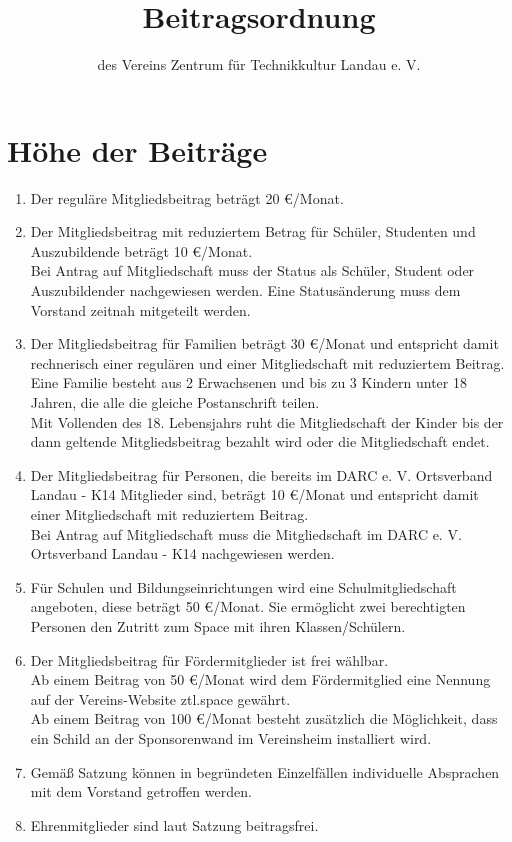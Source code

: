 \documentclass[a4paper, 12pt]{scrartcl}
\begin{document}
\title{Beitragsordnung}
\subtitle{des Vereins Zentrum für Technikkultur Landau e. V.}
\author{}
\date{}

\maketitle

\section{Höhe der Beiträge}\label{beitraege}
\begin{enumerate}
	\item Der reguläre Mitgliedsbeitrag beträgt 20 \euro/Monat.
	\item Der Mitgliedsbeitrag mit reduziertem Betrag für Schüler, Studenten und Auszubildende beträgt 10 \euro/Monat.\\ 
	Bei Antrag auf Mitgliedschaft muss der Status als Schüler, Student oder Auszubildender nachgewiesen werden.
	Eine Statusänderung muss dem Vorstand zeitnah mitgeteilt werden.
	\item Der Mitgliedsbeitrag für Familien beträgt 30 \euro/Monat und entspricht damit rechnerisch einer regulären und einer Mitgliedschaft mit reduziertem Beitrag. \\ 
Eine Familie besteht aus 2 Erwachsenen und bis zu 3 Kindern unter 18 Jahren, die alle die gleiche Postanschrift teilen.\\
Mit Vollenden des 18. Lebensjahrs ruht die Mitgliedschaft der Kinder bis der dann geltende Mitgliedsbeitrag bezahlt wird oder die Mitgliedschaft endet. 
	\item Der Mitgliedsbeitrag für Personen, die bereits im DARC e. V. Ortsverband Landau - K14 Mitglieder sind, beträgt 10 \euro/Monat und entspricht damit einer Mitgliedschaft mit reduziertem Beitrag.\\ Bei Antrag auf Mitgliedschaft muss die Mitgliedschaft im DARC e. V. Ortsverband Landau - K14 nachgewiesen werden.
	\item \label{beitraege-schulmitgliedschaft} Für Schulen und Bildungseinrichtungen wird eine Schulmitgliedschaft angeboten, diese beträgt 50 \euro/Monat. Sie ermöglicht zwei berechtigten Personen den Zutritt zum Space mit ihren Klassen/Schülern.
	\item Der Mitgliedsbeitrag für Fördermitglieder ist frei wählbar. \\
	Ab einem Beitrag von 50 \euro/Monat wird dem Fördermitglied eine Nennung auf der Vereins-Website ztl.space gewährt. \\
	Ab einem Beitrag von 100 \euro/Monat besteht zusätzlich die Möglichkeit, dass ein Schild an der Sponsorenwand im Vereinsheim installiert wird.
	\item Gemäß Satzung können in begründeten Einzelfällen individuelle Absprachen mit dem Vorstand getroffen werden. 
	\item Ehrenmitglieder sind laut Satzung beitragsfrei.
\end{enumerate}
\end{document}
